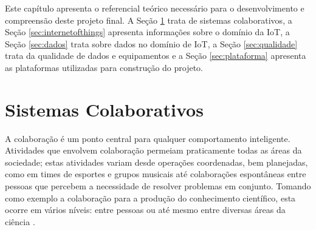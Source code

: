 \null \quad Este capítulo apresenta o referencial teórico necessário para o desenvolvimento e compreensão deste projeto final. A Seção \ref{sec:siscol} trata de sistemas colaborativos, a Seção \ref{sec:internetofthings} apresenta informações sobre o domínio da \acrfull{IoT}, a Seção \ref{sec:dados} trata sobre dados no domínio de \acrshort{IoT}, a Seção \ref{sec:qualidade} trata da qualidade de dados e equipamentos e a Seção \ref{sec:plataforma} apresenta as plataformas utilizadas para construção do projeto.

\section{Sistemas Colaborativos}
\label{sec:siscol}
\null \quad A colaboração é um ponto central para qualquer comportamento inteligente.
Atividades que envolvem colaboração permeiam praticamente todas as áreas da sociedade; estas atividades variam desde operações coordenadas,
bem planejadas, como em times de esportes e grupos musicais até colaborações espontâneas
entre pessoas que percebem a necessidade de resolver problemas em conjunto.
Tomando como exemplo a colaboração para a produção do conhecimento científico, esta ocorre em vários níveis: entre pessoas ou até mesmo entre diversas áreas da ciência \cite{cbarbara}.

